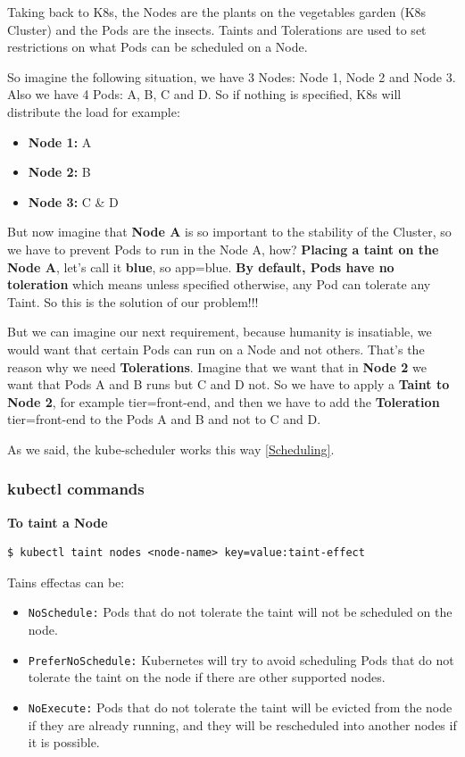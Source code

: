 \documentclass{article}
\newenvironment{codetemplate}[1][]{%
  \mybasecolorbox[#1]
  \itshape
}{%
  \endmybasecolorbox
}
\begin{document}
Taking back to K8s, the Nodes are the plants on the vegetables garden (K8s Cluster) and the Pods are the insects. Taints and Tolerations are used to set restrictions on what Pods can be scheduled on a Node.

So imagine the following situation, we have 3 Nodes: Node 1, Node 2 and Node 3. Also we have 4 Pods: A, B, C and D. So if nothing is specified, K8s will distribute the load for example:

\begin{itemize}
    \item \textbf{Node 1:} A
    \item \textbf{Node 2:} B
    \item \textbf{Node 3:} C \& D
\end{itemize}

But now imagine that \textbf{Node A} is so important to the stability of the Cluster, so we have to prevent Pods to run in the Node A, how? \textbf{Placing a taint on the Node A}, let's call it \textbf{blue}, so app=blue. \textbf{By default, Pods have no toleration} which means unless specified otherwise, any Pod can tolerate any Taint. So this is the solution of our problem!!!

But we can imagine our next requirement, because humanity is insatiable, we would want that certain Pods can run on a Node and not others. That's the reason why we need \textbf{Tolerations}. Imagine that we want that in \textbf{Node 2} we want that Pods A and B runs but C and D not. So we have to apply a \textbf{Taint to Node 2}, for example tier=front-end, and then we have to add the \textbf{Toleration} tier=front-end to the Pods A and B and not to C and D.

As we said, the kube-scheduler works this way \ref{Scheduling}. 

\subsubsection{kubectl commands}

\textbf{To taint a Node}
\begin{codetemplate}{}
\begin{verbatim}
$ kubectl taint nodes <node-name> key=value:taint-effect
\end{verbatim}
\end{codetemplate}

Tains effectas can be:
\begin{itemize}
    \item \verb|NoSchedule:| Pods that do not tolerate the taint will not be scheduled on the node.
    \item \verb|PreferNoSchedule:| Kubernetes will try to avoid scheduling Pods that do not tolerate the taint on the node if there are other supported nodes.
    \item \verb|NoExecute:| Pods that do not tolerate the taint will be evicted from the node if they are already running, and they will be rescheduled into another nodes if it is possible.
\end{itemize}
\end{document}
